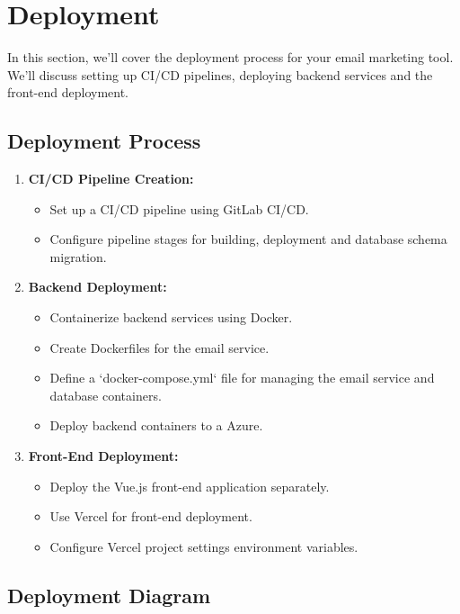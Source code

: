 \section{Deployment}

In this section, we'll cover the deployment process for your email marketing tool. We'll discuss setting up CI/CD pipelines, deploying backend services and the front-end deployment.

\subsection{Deployment Process}

\begin{enumerate}
    \item \textbf{CI/CD Pipeline Creation:}
        \begin{itemize}
            \item Set up a CI/CD pipeline using GitLab CI/CD.
            \item Configure pipeline stages for building, deployment and database schema migration.
        \end{itemize}
    
    \item \textbf{Backend Deployment:}
        \begin{itemize}
            \item Containerize backend services using Docker.
            \item Create Dockerfiles for the email service.
            \item Define a `docker-compose.yml` file for managing the email service and database containers.
            \item Deploy backend containers to a Azure.
        \end{itemize}
    
    \item \textbf{Front-End Deployment:}
        \begin{itemize}
            \item Deploy the Vue.js front-end application separately.
            \item Use Vercel for front-end deployment.
            \item Configure Vercel project settings environment variables.
        \end{itemize}
\end{enumerate}

\clearpage
\subsection{Deployment Diagram}

